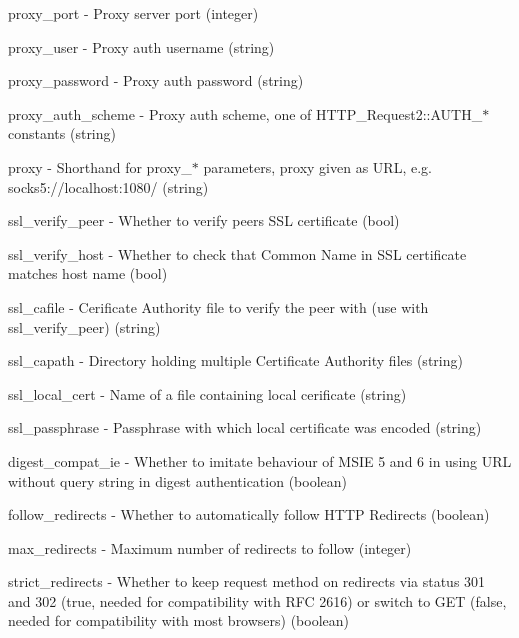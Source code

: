 \begin{DoxyItemize}
\item \textquotesingle{}proxy\+\_\+port\textquotesingle{} -\/ Proxy server port (integer) 
\item \textquotesingle{}proxy\+\_\+user\textquotesingle{} -\/ Proxy auth username (string) 
\item \textquotesingle{}proxy\+\_\+password\textquotesingle{} -\/ Proxy auth password (string) 
\item \textquotesingle{}proxy\+\_\+auth\+\_\+scheme\textquotesingle{} -\/ Proxy auth scheme, one of H\+T\+T\+P\+\_\+\+Request2\+::\+A\+U\+T\+H\+\_\+$\ast$ constants (string) 
\item \textquotesingle{}proxy\textquotesingle{} -\/ Shorthand for proxy\+\_\+$\ast$ parameters, proxy given as U\+RL, e.\+g. \textquotesingle{}socks5\+://localhost\+:1080/\textquotesingle{} (string) 
\item \textquotesingle{}ssl\+\_\+verify\+\_\+peer\textquotesingle{} -\/ Whether to verify peer\textquotesingle{}s S\+SL certificate (bool) 
\item \textquotesingle{}ssl\+\_\+verify\+\_\+host\textquotesingle{} -\/ Whether to check that Common Name in S\+SL certificate matches host name (bool) 
\item \textquotesingle{}ssl\+\_\+cafile\textquotesingle{} -\/ Cerificate Authority file to verify the peer with (use with \textquotesingle{}ssl\+\_\+verify\+\_\+peer\textquotesingle{}) (string) 
\item \textquotesingle{}ssl\+\_\+capath\textquotesingle{} -\/ Directory holding multiple Certificate Authority files (string) 
\item \textquotesingle{}ssl\+\_\+local\+\_\+cert\textquotesingle{} -\/ Name of a file containing local cerificate (string) 
\item \textquotesingle{}ssl\+\_\+passphrase\textquotesingle{} -\/ Passphrase with which local certificate was encoded (string) 
\item \textquotesingle{}digest\+\_\+compat\+\_\+ie\textquotesingle{} -\/ Whether to imitate behaviour of M\+S\+IE 5 and 6 in using U\+RL without query string in digest authentication (boolean) 
\item \textquotesingle{}follow\+\_\+redirects\textquotesingle{} -\/ Whether to automatically follow H\+T\+TP Redirects (boolean) 
\item \textquotesingle{}max\+\_\+redirects\textquotesingle{} -\/ Maximum number of redirects to follow (integer) 
\item \textquotesingle{}strict\+\_\+redirects\textquotesingle{} -\/ Whether to keep request method on redirects via status 301 and 302 (true, needed for compatibility with R\+FC 2616) or switch to G\+ET (false, needed for compatibility with most browsers) (boolean) 
\end{DoxyItemize}


